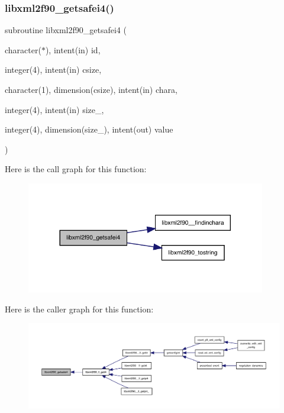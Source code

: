 \subsubsection{\texorpdfstring{libxml2f90\+\_\+getsafei4()}{libxml2f90\_getsafei4()}}
{\footnotesize\ttfamily subroutine libxml2f90\+\_\+getsafei4 (\begin{DoxyParamCaption}\item[{character($\ast$), intent(in)}]{id,  }\item[{integer(4), intent(in)}]{csize,  }\item[{character(1), dimension(csize), intent(in)}]{chara,  }\item[{integer(4), intent(in)}]{size\+\_\+,  }\item[{integer(4), dimension(size\+\_\+), intent(out)}]{value }\end{DoxyParamCaption})}

Here is the call graph for this function\+:
\nopagebreak
\begin{figure}[H]
\begin{center}
\leavevmode
\includegraphics[width=296pt]{libxml2f90_8f90__pp_8f90_ac813de3235a2af4f169c5434743f86a2_cgraph}
\end{center}
\end{figure}
Here is the caller graph for this function\+:
\nopagebreak
\begin{figure}[H]
\begin{center}
\leavevmode
\includegraphics[width=350pt]{libxml2f90_8f90__pp_8f90_ac813de3235a2af4f169c5434743f86a2_icgraph}
\end{center}
\end{figure}
\mbox{\label{libxml2f90_8f90__pp_8f90_a28f8b34bc930ad861c2ee4d764f945ba}} 

